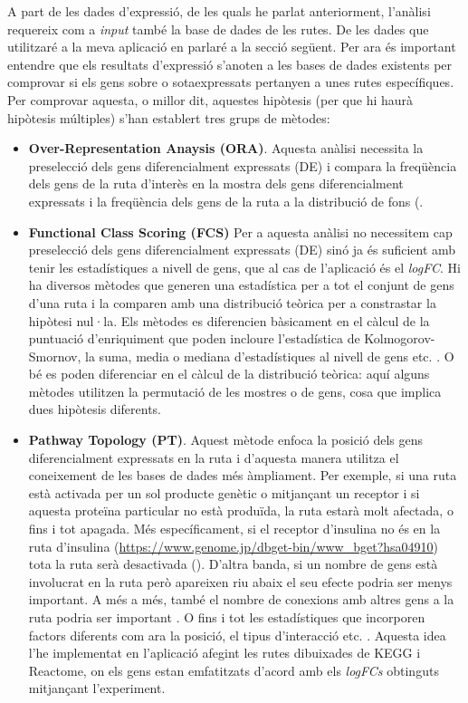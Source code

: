 A part de les dades d'expressió, de les quals he parlat anteriorment, l'anàlisi requereix com a \textit{input} també la base de dades de les rutes. De les dades que utilitzaré a la meva aplicació en parlaré a la secció següent. Per ara és important entendre que els resultats d'expressió s'anoten a les bases de dades existents per comprovar si els gens sobre o sotaexpressats pertanyen a unes rutes específiques. Per comprovar aquesta, o millor dit, aquestes hipòtesis (per que hi haurà hipòtesis múltiples) s'han establert tres grups de mètodes:

\begin{itemize}
\item \textbf{Over-Representation Anaysis (\gls{ORA})}.
Aquesta anàlisi necessita la preselecció dels gens diferencialment expressats (DE) i compara la freqüència dels gens de la ruta d'interès en la mostra dels gens diferencialment expressats i la freqüència dels gens de la ruta a la distribució de fons (\cite{boyle2004go}. 
\item \textbf{Functional Class Scoring (\gls{FCS})}
Per a aquesta anàlisi no necessitem cap preselecció dels gens diferencialment expressats (DE) sinó ja és suficient amb tenir les estadístiques a nivell de gens, que al cas de l'aplicació és el \textit{\gls{logFC}}. Hi ha diversos mètodes que generen una estadística per a tot el conjunt de gens d'una ruta i la comparen amb una distribució teòrica per a constrastar la hipòtesi nul·la. Els mètodes es diferencien bàsicament en el càlcul de la puntuació d'enriquiment que poden incloure l'estadística de Kolmogorov-Smornov, la suma, media o mediana d'estadístiques al nivell de gens etc. \cite{khatri2012ten}. O bé es poden diferenciar en el càlcul de la distribució teòrica: aquí alguns mètodes utilitzen la permutació de les mostres o de gens, cosa que implica dues hipòtesis diferents. 
\item \textbf{Pathway Topology (\gls{PT})}.
Aquest mètode enfoca la posició dels gens diferencialment expressats en la ruta i d'aquesta manera utilitza el coneixement de les bases de dades més àmpliament. Per exemple, si una ruta està activada per un sol producte genètic o mitjançant un receptor i si aquesta proteïna particular no està produïda, la ruta estarà molt afectada, o fins i tot apagada. Més específicament, si el receptor d'insulina no és en la ruta d'insulina (\url{https://www.genome.jp/dbget-bin/www_bget?hsa04910}) tota la ruta serà desactivada (\cite{tarca2008novel}). D'altra banda, si un nombre de gens està involucrat en la ruta però apareixen riu abaix el seu efecte podria ser menys important. A més a més, també el nombre de conexions amb altres gens a la ruta podria ser important \cite{rahnenfuhrer2004calculating}. O fins i tot les estadístiques que incorporen factors diferents com ara la posició, el tipus d'interacció etc. \cite{draghici2007systems}. Aquesta idea l'he implementat en l'aplicació afegint les rutes dibuixades de \gls{KEGG} i Reactome, on els gens estan emfatitzats d'acord amb els \textit{\gls{logFC}s} obtinguts mitjançant l'experiment.


\end{itemize}
